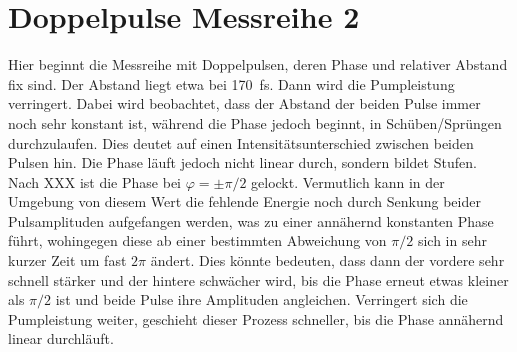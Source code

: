 \documentclass[bachelor,       %
               twoside,        %
               BCOR10mm,       %
               english,ngerman, %
               ]{GAUBM}
\begin{document}
\section{Doppelpulse Messreihe 2}
Hier beginnt die Messreihe mit Doppelpulsen, deren Phase und relativer Abstand fix sind.
Der Abstand liegt etwa bei 170 \,fs.
Dann wird die Pumpleistung verringert.
Dabei wird beobachtet, dass der Abstand der beiden Pulse immer noch sehr konstant ist, während die Phase jedoch beginnt, in Schüben/Sprüngen durchzulaufen.
Dies deutet auf einen Intensitätsunterschied zwischen beiden Pulsen hin.
Die Phase läuft jedoch nicht linear durch, sondern bildet Stufen.
Nach XXX ist die Phase bei $\varphi=\pm\pi/2$ gelockt.
Vermutlich kann in der Umgebung von diesem Wert die fehlende Energie noch durch Senkung beider Pulsamplituden aufgefangen werden, was zu einer annähernd konstanten Phase führt, wohingegen diese ab einer bestimmten Abweichung von $\pi/2$ sich in sehr kurzer Zeit um fast $2\pi$ ändert.
Dies könnte bedeuten, dass dann der vordere sehr schnell stärker und der hintere schwächer wird, bis die Phase erneut etwas kleiner als $\pi/2$ ist und beide Pulse ihre Amplituden angleichen.
Verringert sich die Pumpleistung weiter, geschieht dieser Prozess schneller, bis die Phase annähernd linear durchläuft.
\end{document}
